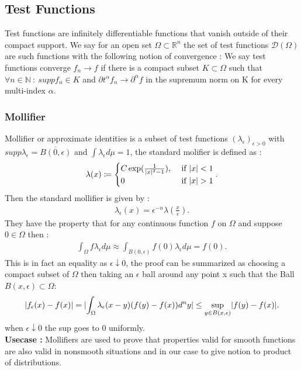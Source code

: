 \subsection{Test Functions} %
\label{sub:Test Functions}
Test functions are infinitely differentiable functions that vanish outside of their compact support.
We say for an open set $\Omega  \subset \mathbb{R}^{n } $ the set of test functions $\mathcal{D}(\Omega )$ are such functions with the following 
notion of convergence : 
We say test functions converge $f_n \to f $ if there is a compact subset $K \subset  \Omega $ such that $\forall n \in  \mathbb{N} \ : \ supp f_n \in K$ and 
$\partial t ^{\alpha }f_n \to \partial ^{\alpha } f $ in the supremum norm on K for every multi-index $\alpha $.
\subsubsection{Mollifier}
Mollifier or approximate identities is a subset of test functions $(\lambda_{\epsilon })_{\epsilon  > 0}$ with 
$supp \lambda_\epsilon  = \overline{B(0,\epsilon )}$ and $\int  \lambda_\epsilon  d\mu  = 1$, the standard molifier is defined as : 
\begin{align*}
  \lambda(x) \coloneqq  \begin{cases}
    C\exp(\frac{1}{\lvert x\rvert^2-1}), &\text{ if }\lvert x\rvert < 1 \\
    0 &\text{ if } \lvert x\rvert>1
  \end{cases}
.\end{align*}
Then the standard mollifier is given by : 
\begin{align*}
  \lambda_\epsilon(x) = \epsilon ^{-n} \lambda (\frac{x}{\epsilon }) 
.\end{align*}
They have the property that for any continuous function $f$ on $\Omega $ and suppose $0 \in \Omega $ then : 
\begin{align*}
  \int_\Omega  f \lambda_\epsilon  d\mu  \approx \int_{B(0,\epsilon )} f(0)\lambda_\epsilon d\mu  = f(0)
.\end{align*}
This is in fact an equality as $\epsilon  \downarrow 0 $, the proof can be summarized as 
choosing a compact subset of $\Omega $ then taking an $\epsilon $ ball around any point x such that the Ball $B(x,\epsilon ) \subset \Omega $: 
\begin{align*}
  \lvert f_{\epsilon }(x) - f(x)\rvert = \lvert\int_\Omega  \lambda_\epsilon (x-y)(f(y)-f(x)) d^{n} y \rvert \le \sup_{y \in  B(x,\epsilon )} \lvert f(y)-f(x)\rvert   
.\end{align*}
when $\epsilon  \downarrow 0 $ the sup goes to 0 uniformly.\\[1ex]
\textbf{Usecase : } Mollifiers are used to prove  that properties valid for smooth functions are also valid in nonsmooth situations
and in our case to give notion to product of distributions.
